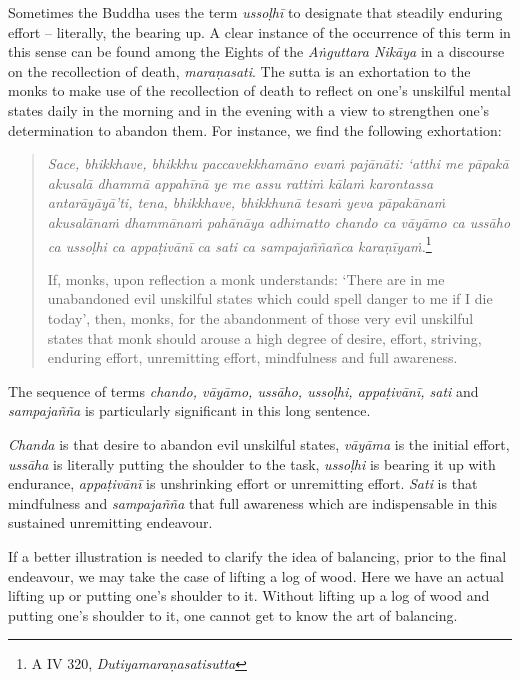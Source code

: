 \enlargethispage{\baselineskip}

Sometimes the Buddha uses the term \emph{ussoḷhī} to designate that steadily enduring effort -- literally, the bearing up. A clear instance of the occurrence of this term in this sense can be found among the Eights of the \emph{Aṅguttara Nikāya} in a discourse on the recollection of death, \emph{maraṇasati}. The sutta is an exhortation to the monks to make use of the recollection of death to reflect on one's unskilful mental states daily in the morning and in the evening with a view to strengthen one's determination to abandon them. For instance, we find the following exhortation:

\begin{quote}
\emph{Sace, bhikkhave, bhikkhu paccavekkhamāno evaṁ pajānāti: `atthi me pāpakā akusalā dhammā appahīnā ye me assu rattiṁ kālaṁ karontassa antarāyāyā'ti, tena, bhikkhave, bhikkhunā tesaṁ yeva pāpakānaṁ akusalānaṁ dhammānaṁ pahānāya adhimatto chando ca vāyāmo ca ussāho ca ussoḷhi ca appaṭivānī ca sati ca sampajaññañca karaṇīyaṁ.}\footnote{A IV 320, \emph{Dutiyamaraṇasatisutta}}

If, monks, upon reflection a monk understands: `There are in me unabandoned evil unskilful states which could spell danger to me if I die today', then, monks, for the abandonment of those very evil unskilful states that monk should arouse a high degree of desire, effort, striving, enduring effort, unremitting effort, mindfulness and full awareness.
\end{quote}

The sequence of terms \emph{chando, vāyāmo, ussāho, ussoḷhi, appaṭivānī, sati} and \emph{sampajañña} is particularly significant in this long sentence.

\emph{Chanda} is that desire to abandon evil unskilful states, \emph{vāyāma} is the initial effort, \emph{ussāha} is literally putting the shoulder to the task, \emph{ussoḷhi} is bearing it up with endurance, \emph{appaṭivānī} is unshrinking effort or unremitting effort. \emph{Sati} is that mindfulness and \emph{sampajañña} that full awareness which are indispensable in this sustained unremitting endeavour.

If a better illustration is needed to clarify the idea of balancing, prior to the final endeavour, we may take the case of lifting a log of wood. Here we have an actual lifting up or putting one's shoulder to it. Without lifting up a log of wood and putting one's shoulder to it, one cannot get to know the art of balancing.

